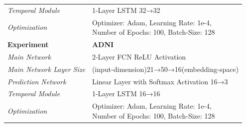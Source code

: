 \begin{table}[!ht]
\begin{tabular}{|l|l|}
\textit{Temporal Module}               & 1-Layer LSTM 32→32                                                                                                                     \\
\textit{Optimization}                  & \shortstack[l]{Optimizer: Adam, Learning Rate: 1e-4, \\ Number of Epochs: 100, Batch-Size: 128}                \\ \hline
\textbf{Experiment}                    & \textbf{ADNI}                                                                                                                          \\ \hline
\textit{Main Network}                  & 2-Layer FCN ReLU Activation                                                                                                            \\
\textit{Main Network Layer Size}       & (input-dimension)21→50→16(embedding-space)                                                                                             \\
\textit{Prediction Network}              & Linear Layer with Softmax Activation 16→3                                                                                              \\
\textit{Temporal Module}               & 1-Layer LSTM 16→16                                                                                                                     \\
\textit{Optimization}                  & \shortstack[l]{Optimizer: Adam, Learning Rate: 1e-4, \\ Number of Epochs: 100, Batch-Size: 128}                \\ \hline
\end{tabular}
\end{table}